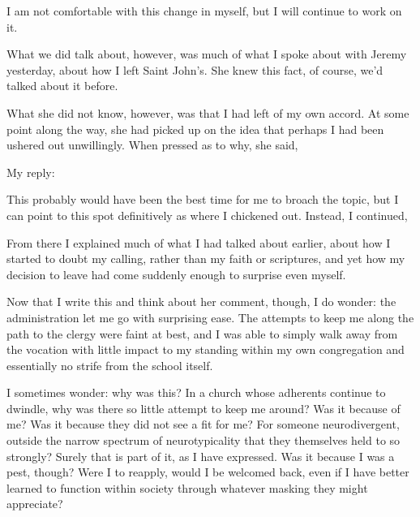 I am not comfortable with this change in myself, but I will continue to work on it.

What we did talk about, however, was much of what I spoke about with Jeremy yesterday, about how I left Saint John's. She knew this fact, of course, we'd talked about it before.

What she did not know, however, was that I had left of my own accord. At some point along the way, she had picked up on the idea that perhaps I had been ushered out unwillingly. When pressed as to why, she said,


My reply:


This probably would have been the best time for me to broach the topic, but I can point to this spot definitively as where I chickened out. Instead, I continued,





From there I explained much of what I had talked about earlier, about how I started to doubt my calling, rather than my faith or scriptures, and yet how my decision to leave had come suddenly enough to surprise even myself.

Now that I write this and think about her comment, though, I do wonder: the administration let me go with surprising ease. The attempts to keep me along the path to the clergy were faint at best, and I was able to simply walk away from the vocation with little impact to my standing within my own congregation and essentially no strife from the school itself.

I sometimes wonder: why was this? In a church whose adherents continue to dwindle, why was there so little attempt to keep me around? Was it because of me? Was it because they did not see a fit for me? For someone neurodivergent, outside the narrow spectrum of neurotypicality that they themselves held to so strongly? Surely that is part of it, as I have expressed. Was it because I was a pest, though? Were I to reapply, would I be welcomed back, even if I have better learned to function within society through whatever masking they might appreciate?


